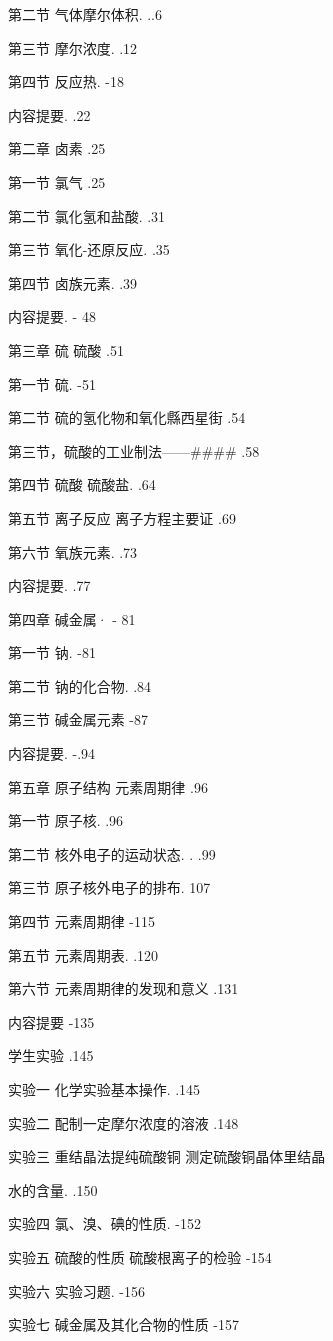 \documentclass[10pt]{article}
\begin{document}
第二节 气体摩尔体积. ..6

第三节 摩尔浓度. .12

第四节 反应热. -18

内容提要. .22

第二章 卤素 .25

第一节 氯气 .25

第二节 氯化氢和盐酸. .31

第三节 氧化-还原反应. .35

第四节 卤族元素. .39

内容提要. - 48

第三章 硫 硫酸 .51

第一节 硫. -51

第二节 硫的氢化物和氧化縣西星街 .54

第三节，硫酸的工业制法——\#\#\#\# .58

第四节 硫酸 硫酸盐. .64

第五节 离子反应 离子方程主要证 .69

第六节 氧族元素. .73

内容提要. .77

第四章 碱金属· - 81

第一节 钠. -81

第二节 钠的化合物. .84

第三节 碱金属元素 -87

内容提要. -.94

第五章 原子结构 元素周期律 .96

第一节 原子核. .96

第二节 核外电子的运动状态. . .99

第三节 原子核外电子的排布. 107

第四节 元素周期律 -115

第五节 元素周期表. .120

第六节 元素周期律的发现和意义 .131

内容提要 -135

学生实验 .145

实验一 化学实验基本操作. .145

实验二 配制一定摩尔浓度的溶液 .148

实验三 重结晶法提纯硫酸铜 测定硫酸铜晶体里结晶

水的含量. .150

实验四 氯、溴、碘的性质. -152

实验五 硫酸的性质 硫酸根离子的检验 -154

实验六 实验习题. -156

实验七 碱金属及其化合物的性质 -157
\end{document}
